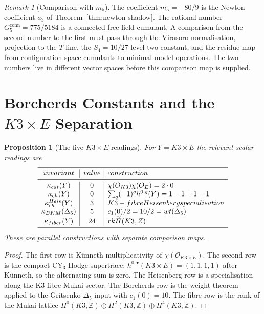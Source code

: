 \documentclass[11pt]{article}
\newtheorem{proposition}[theorem]{Proposition}
\theoremstyle{definition}
\theoremstyle{remark}
\newtheorem{remark}[theorem]{Remark}
\newcommand{\kch}{\kappa_{\mathrm{ch}}}
\newcommand{\kcat}{\kappa_{\mathrm{cat}}}
\newcommand{\kBKM}{\kappa_{\mathrm{BKM}}}
\newcommand{\kfiber}{\kappa_{\mathrm{fiber}}}
\newcommand{\conn}{\mathrm{conn}}
\begin{document}
\begin{remark}[Comparison with $m_5$]
\label{rem:g5-m5-comparison}
The coefficient $m_5=-80/9$ is the Newton coefficient $a_3$ of
Theorem~\ref{thm:newton-shadow}. The rational number
$G_5^{\conn}=775/5184$ is a connected free-field cumulant. A comparison
from the second number to the first must pass through the Virasoro
normalisation, projection to the $T$-line, the $S_4=10/27$ level-two
constant, and the residue map from configuration-space cumulants to
minimal-model operations. The two numbers live in different vector
spaces before this comparison map is supplied.
\end{remark}

\section{Borcherds Constants and the $K3\times E$ Separation}
\label{sec:borcherds-k3e}

\begin{proposition}[The five $K3\times E$ readings]
\label{prop:k3e-readings}
For $Y=K3\times E$ the relevant scalar readings are
\[
\begin{array}{c|c|l}
\toprule
\textup{invariant} & \textup{value} & \textup{construction}\\
\midrule
\kcat(Y) & 0 &
\chi(\mathcal{O}_{K3})\chi(\mathcal{O}_{E})=2\cdot0\\
\kch(Y) & 0 &
\sum_q(-1)^qh^{0,q}(Y)=1-1+1-1\\
\kch^{\mathrm{Heis}}(Y) & 3 &
\textup{K3-fibre Heisenberg specialisation}\\
\kBKM(\Delta_5) & 5 &
c_1(0)/2=10/2=\operatorname{wt}(\Delta_5)\\
\kfiber(Y) & 24 &
\operatorname{rk}\widetilde H(K3,\mathbb{Z})\\
\bottomrule
\end{array}
\]
These are parallel constructions with separate comparison maps.
\end{proposition}

\begin{proof}
The first row is K\"unneth multiplicativity of
$\chi(\mathcal{O}_{K3\times E})$. The second row is the compact
CY$_3$ Hodge supertrace:
$h^{0,\bullet}(K3\times E)=(1,1,1,1)$ after K\"unneth, so the alternating
sum is zero. The Heisenberg row is a specialisation along the K3-fibre
Mukai sector. The Borcherds row is the weight theorem applied to the
Gritsenko $\Delta_5$ input with $c_1(0)=10$. The fibre row is the rank
of the Mukai lattice
$H^0(K3,\mathbb{Z})\oplus H^2(K3,\mathbb{Z})\oplus H^4(K3,\mathbb{Z})$.
\end{proof}
\end{document}
